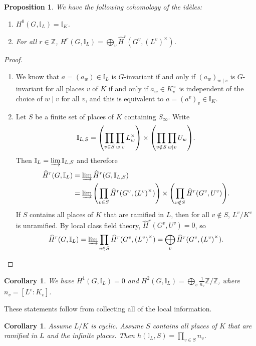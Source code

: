 \documentclass[leqno, openany]{memoir}
\newtheorem{cor}[thm]{Corollary}
\newtheorem{prop}[thm]{Proposition}
\theoremstyle{definition}
\theoremstyle{remark}
\theoremstyle{plain}
\theoremstyle{definition}
\theoremstyle{remark}
\newcommand{\Z}{\mathbb{Z}}
\newcommand{\I}{\mathbb{I}}
\newcommand{\wh}[1]{\widehat{#1}}
\begin{document}
\begin{prop}\leavevmode
    We have the following cohomology of the id\`eles:
    \begin{enumerate}
        \item $H^0(G, \I_L) = \I_K$.
        \item For all $r \in \Z$, $H^r(G, \I_L) = \bigoplus_v \wh{H}^r(G^v, {(L^v)}^{\times})$.
    \end{enumerate}
\end{prop}

\begin{proof}\leavevmode
    \begin{enumerate}
        \item We know that $a = {(a_w)} \in \I_L$ is $G$-invariant if and only if ${(a_w)}_{w \mid v}$ is $G$-invariant for all places $v$ of $K$ if and only if $a_w \in K_v^{\times}$ is independent of the choice of $w \mid v$ for all $v$, and this is equivalent to $a = {(a^v)}_v \in \I_K$.
        \item Let $S$ be a finite set of places of $K$ containing $S_{\infty}$. Write
            \[ \I_{L, S} = \qty(\prod_{v \in S} \prod_{w \mid v} L_w^{\times}) \times \qty(\prod_{v \notin S} \prod_{w \mid v} U_w). \]
            Then $\I_L = \varinjlim \I_{L, S}$ and therefore 
            \begin{align*}
                \wh{H}^r(G, \I_L) &= \varinjlim \wh{H}^r(G, \I_{L, S}) \\
                                  &= \varinjlim \qty(\prod_{v \in S} \wh{H}^r(G^v, {(L^v)}^{\times})) \times \qty(\prod_{v \notin S} \wh{H}^r(G^v, U^v)).
            \end{align*}
            If $S$ contains all places of $K$ that are ramified in $L$, then for all $v \notin S$, $L^v/K^v$ is unramified. By local class field theory, $\wh{H}^r(G^v, U^v) = 0$, so 
            \[ \wh{H}^r(G, \I_L) = \varinjlim \prod_{v \in S} \wh{H}^r(G^v, {(L^v)}^{\times}) = \bigoplus_v \wh{H}^r(G^v, {(L^v)}^{\times}). \qedhere \]
    \end{enumerate}
\end{proof}

\begin{cor}
    We have $H^1(G, \I_L) = 0$ and $H^2(G, \I_L) = \bigoplus_v \frac{1}{n_v} \Z/\Z$, where $n_v = [L^v: K_v]$.
\end{cor}

These statements follow from collecting all of the local information.

\begin{cor}
    Assume $L/K$ is cyclic. Assume $S$ contains all places of $K$ that are ramified in $L$ and the infinite places. Then $h(\I_L, S) = \prod_{v \in S} n_v$.
\end{cor}
\end{document}
